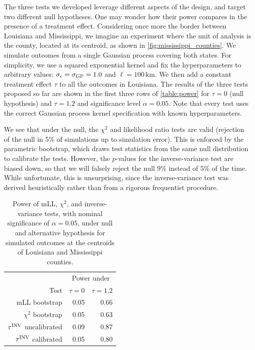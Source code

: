     The three tests we developed leverage different aspects of the design, and target two different null hypotheses. One may wonder how their power compares in the presence of a treatment effect. Considering once more the border between Louisiana and Mississippi, we imagine an experiment where the unit of analysis is the county, located at its centroid, as shown in \autoref{fig:mississippi_counties}.
We simulate outcomes from a single Gaussian process covering both states. For simplicity, we use a squared exponential kernel and fix the hyperparameters to arbitrary values: \(\sigma_{\epsilon}=\sigma_{\mathrm{GP}}=1.0\) and \(\ell=100\,\mathrm{km}\).
We then add a constant treatment effect \(\tau\) to all the outcomes in Louisiana.
The results of the three tests proposed so far are shown in the first three rows of \autoref{table:power} for \(\tau=0\) (null hypothesis) and \(\tau=1.2\) and significance level \(\alpha=0.05\).
Note that every test uses the correct Gaussian process kernel specification with known hyperparameters.

    We see that under the null, the \(\chi^2\) and likelihood ratio tests are valid (rejection of the null in 5\% of simulations up to simulation error).
This is enforced by the parametric bootstrap, which draws test statistics from the same null distribution to calibrate the tests.
However, the \(p\)-values for the inverse-variance test are biased down, so that we will falsely reject the null \(9\%\) instead of \(5\%\) of the time.
While unfortunate, this is unsurprising, since the inverse-variance test was derived heuristically rather than from a rigorous frequentist procedure.

\begin{table}
    \centering
    \bgroup
    \def\arraystretch{1.1}%
    \centering
    \begin{tabular}{rrr}
        \hline
        & \multicolumn{2}{c}{Power under} \\
        Test & \(\tau=0\) & \(\tau=1.2\) \\
        \hline
        mLL bootstrap            & 0.05 & 0.66 \\
        \(\chi^2\) bootstrap     & 0.05 & 0.63 \\
        \(\tau^{\mathrm{INV}}\) uncalibrated & 0.09 & 0.87 \\
        \(\tau^{\mathrm{INV}}\) calibrated   & 0.05 & 0.80 \\
        \hline
    \end{tabular}
    \egroup
    \caption{
        Power of mLL, \(\chi^2\), and inverse-variance tests, with nominal significance of \(\alpha=0.05\), under null and alternative hypothesis for simulated outcomes at the centroids of Louisiana and Mississippi counties.
        \label{table:power}
    }
\end{table}

